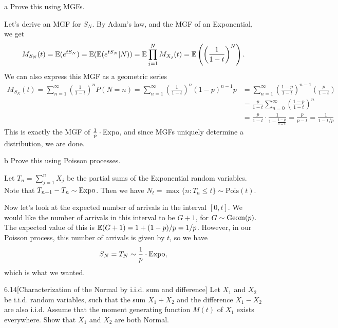 \documentclass{pset}
\begin{document}
\begin{parts}
  \begin{part}{a}
    Prove this using MGFs.
  \end{part}

  Let's derive an MGF for $S_N$. By Adam's law, and the MGF of an Exponential, we get
  \[
    M_{S_N}(t) = \mathbb{E}(e^{tS_N}) = \mathbb{E}(\mathbb{E}(e^{tS_N} | N)) = \mathbb{E}\prod^N_{j=1} M_{X_j}(t) = \mathbb{E}\left(\left(\frac{1}{1-t}\right)^N\right).
  \]
  We can also express this MGF as a geometric series 
  \[
    \begin{aligned}
      M_{S_N}(t)=\sum^\infty_{n=1}\left(\frac{1}{1-t}\right)^n P(N=n) = \sum^\infty_{n=1}\left(\frac{1}{1-t}\right)^n (1-p)^{n-1}p &= \sum^\infty_{n=1}\left(\frac{1-p}{1-t}\right)^{n-1}\left(\frac{p}{1-t}\right)\\
      &= \frac{p}{1-t}\sum^\infty_{n=0}\left(\frac{1-p}{1-t}\right)^n\\
      &= \frac{p}{1-t}\cdot\frac{1}{1-\frac{1-p}{1-t}} = \frac{p}{p-t}=\frac{1}{1-t/p}
    \end{aligned}
  \]
  This is exactly the MGF of $\frac{1}{p}\cdot \textrm{Expo}$, and since MGFs uniquely determine a distribution, we are done.

  \begin{part}{b}
    Prove this using Poisson processes.
  \end{part}

  Let $T_n = \sum^n_{j=1} X_j$ be the partial sums of the Exponential random variables. Note that $T_{n+1} - T_n \sim \textrm{Expo}$. Then we have $N_t = \max\{n : T_n \leq t\} \sim \textrm{Pois}(t)$. 

  Now let's look at the expected number of arrivals in the interval $[0,t]$. We would like the number of arrivals in this interval to be $G+1$, for $G\sim \textrm{Geom}(p)$. The expected value of this is $\mathbb{E}(G+1)=1+(1-p)/p = 1/p$. However, in our Poisson process, this number of arrivals is given by $t$, so we have
  \[S_N = T_N \sim \frac{1}{p}\cdot \textrm{Expo},\]
  which is what we wanted.
\end{parts}

\begin{problem}{6.14}[Characterization of the Normal by i.i.d. sum and difference]
  Let $X_1$ and $X_2$ be i.i.d. random variables, such that the sum $X_1 + X_2$ and the difference $X_1 - X_2$ are also i.i.d. Assume that the moment generating function $M(t)$ of $X_1$ exists everywhere. Show that $X_1$ and $X_2$ are both Normal.
\end{problem}
\end{document}
